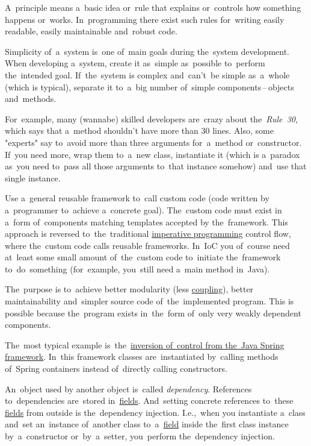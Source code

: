 A~principle means a~basic idea or~rule that explains or~controls how something happens or~works.
In~programming there exist such rules for~writing easily readable, easily maintainable and~robust code.

Simplicity of~a~system is~one of~main goals during the~system development.
When developing a~system, create it as~simple as~possible to~perform the~intended goal.
If~the~system is complex and~can't~be simple as~a~whole (which is typical), separate it to~a~big number of~simple components\,--\,objects and~methods.

For~example, many (wannabe) skilled developers are~crazy about the~\textit{Rule~30}, which says that a~method shouldn't have more than 30 lines.
Also, some "experts" say to~avoid more than three arguments for~a~method or~constructor.
If~you need more, wrap them to~a~new class, instantiate it (which is a~paradox as~you need to~pass all those arguments to~that instance somehow) and~use that single instance.

\label{inversionofcontrol}
Use a~general reusable framework to~call custom code (code written by a~programmer to~achieve a~concrete goal).
The~custom code must exist in a~form of~components matching templates accepted by the~framework.
This approach is reversed to~the~traditional \hyperref[imperativeprogramming]{imperative programming} control flow, where the~custom code calls reusable frameworks.
In~IoC you of~course need at~least some small amount of~the~custom code to~initiate the~framework to~do~something (for~example, you~still need a~main method in~Java).

The~purpose is to~achieve better modularity (less \hyperref[loosetightcoupling]{coupling}), better maintainability and~simpler source code of~the~implemented program.
This is possible because the~program exists in~the~form of~only very weakly dependent components.

The~most typical example is~the~\hyperref[springinversionofcontrol]{inversion of~control from the~Java Spring framework}.
In~this framework classes are~instantiated by~calling methods of~Spring containers instead of~directly calling constructors.

\label{dependencyinjection}
An~object used by another object is~called \textit{dependency}.
References to~dependencies are~stored in~\hyperref[variablefieldproperty]{fields}.
And~setting concrete references to~these \hyperref[variablefieldproperty]{fields} from outside is the~dependency injection.
I.e.,~when you instantiate a~class and~set an~instance of~another class to~a~\hyperref[variablefieldproperty]{field} inside the~first class instance by~a~constructor or~by~a~setter, you~perform the~dependency injection.

